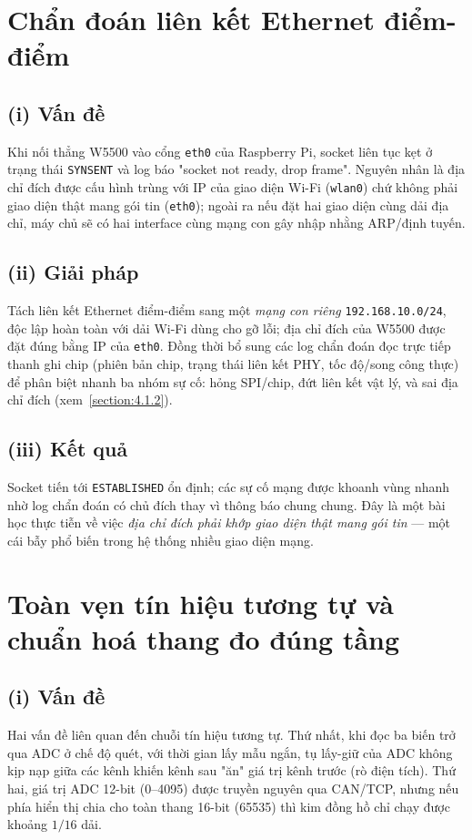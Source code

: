 \documentclass[../DoAn.tex]{subfiles}
\begin{document}
\section{Chẩn đoán liên kết Ethernet điểm-điểm}
\label{section:5.5}

\subsection*{(i) Vấn đề}
Khi nối thẳng W5500 vào cổng \texttt{eth0} của Raspberry Pi, socket liên tục kẹt
ở trạng thái \texttt{SYNSENT} và log báo "socket not ready, drop frame". Nguyên
nhân là địa chỉ đích được cấu hình trùng với IP của giao diện Wi-Fi (\texttt{wlan0})
chứ không phải giao diện thật mang gói tin (\texttt{eth0}); ngoài ra nếu đặt hai
giao diện cùng dải địa chỉ, máy chủ sẽ có hai interface cùng mạng con gây nhập
nhằng ARP/định tuyến.

\subsection*{(ii) Giải pháp}
Tách liên kết Ethernet điểm-điểm sang một \emph{mạng con riêng}
\texttt{192.168.10.0/24}, độc lập hoàn toàn với dải Wi-Fi dùng cho gỡ lỗi; địa
chỉ đích của W5500 được đặt đúng bằng IP của \texttt{eth0}. Đồng thời bổ sung các
log chẩn đoán đọc trực tiếp thanh ghi chip (phiên bản chip, trạng thái liên kết
PHY, tốc độ/song công thực) để phân biệt nhanh ba nhóm sự cố: hỏng SPI/chip, đứt
liên kết vật lý, và sai địa chỉ đích (xem~\ref{section:4.1.2}).

\subsection*{(iii) Kết quả}
Socket tiến tới \texttt{ESTABLISHED} ổn định; các sự cố mạng được khoanh vùng
nhanh nhờ log chẩn đoán có chủ đích thay vì thông báo chung chung. Đây là một bài
học thực tiễn về việc \emph{địa chỉ đích phải khớp giao diện thật mang gói tin} —
một cái bẫy phổ biến trong hệ thống nhiều giao diện mạng.

\section{Toàn vẹn tín hiệu tương tự và chuẩn hoá thang đo đúng tầng}
\label{section:5.6}

\subsection*{(i) Vấn đề}
Hai vấn đề liên quan đến chuỗi tín hiệu tương tự. Thứ nhất, khi đọc ba biến trở
qua ADC ở chế độ quét, với thời gian lấy mẫu ngắn, tụ lấy-giữ của ADC không kịp
nạp giữa các kênh khiến kênh sau "ăn" giá trị kênh trước (rò điện tích). Thứ hai,
giá trị ADC 12-bit (0--4095) được truyền nguyên qua CAN/TCP, nhưng nếu phía hiển
thị chia cho toàn thang 16-bit (65535) thì kim đồng hồ chỉ chạy được khoảng
$1/16$ dải.
\end{document}
